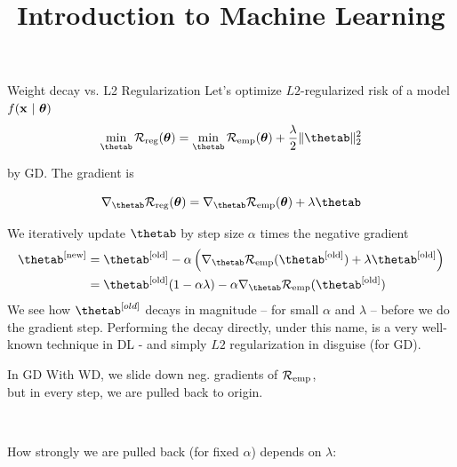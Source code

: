 \documentclass[11pt,compress,t,notes=noshow, xcolor=table]{beamer}
\title{Introduction to Machine Learning}
\begin{document}




\begin{vbframe}{Weight decay vs. L2 Regularization}
Let's optimize $L2$-regularized risk of a model $f(\mathbf{x} ~|~ \bm{\theta})$
\vspace{-0.2cm}
\[
\min_{\thetab} \riskrt = \min_{\thetab} \risket + \frac{\lambda}{2} \|\thetab\|^2_2
\]

by GD. The gradient is

\[
\nabla_{\thetab} \riskrt = \nabla_{\thetab} \risket + \lambda \thetab
\]

We iteratively update $\thetab$ by step size \(\alpha\) times the
negative gradient
\vspace{-0.2cm}
\begin{align*}
\thetab^{[\text{new}]} &= \thetab^{[\text{old}]} - \alpha \left(\nabla_{\thetab} \riske(\thetab^{[\text{old}]}) + \lambda \thetab^{[\text{old}]}\right) \\&=
\thetab^{[\text{old}]} (1 - \alpha \lambda) - \alpha \nabla_{\thetab} \riske(\thetab^{[\text{old}]})
\end{align*}
{\small
We see how $\thetab^{[old]}$ decays in magnitude -- for small $\alpha$ and $\lambda$ -- before we do the gradient step. Performing the decay directly, under this name, is a very well-known technique in DL - and simply $L2$ regularization in disguise (for GD).
}
\framebreak


In GD With WD, we slide down neg. gradients of $\mathcal{R}_{\text{emp}}$, \\
but in every step, we are pulled back to origin.
\begin{figure}
  \\
\end{figure}


\framebreak

How strongly we are pulled back (for fixed $\alpha$) depends on $\lambda$:


\end{vbframe}
\end{document}
